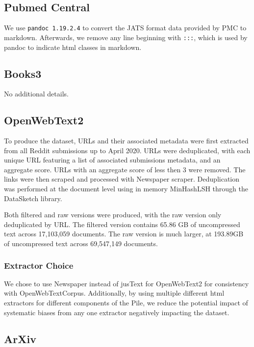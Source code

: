 \documentclass[11pt,a4paper]{article}
\begin{document}
\begin{appendices}
\subsection{Pubmed Central}

We use {\tt pandoc 1.19.2.4} \citep{pandoc} to convert the JATS format data provided by PMC to markdown. Afterwards, we remove any line beginning with {\tt :::}, which is used by pandoc to indicate html classes in markdown.

\subsection{Books3}

No additional details.

\subsection{OpenWebText2}

To produce the dataset, URLs and their associated metadata were first extracted from all Reddit submissions up to April 2020. URLs were deduplicated, with each unique URL featuring a list of associated submissions metadata, and an aggregate score. URLs with an aggregate score of less then 3 were removed. The links were then scraped and processed with Newspaper scraper. Deduplication was performed at the document level using in memory MinHashLSH through the DataSketch library.

Both filtered and raw versions were produced, with the raw version only deduplicated by URL. The filtered version contains 65.86 GB of uncompressed text across 17,103,059 documents. The raw version is much larger, at 193.89GB of uncompressed text across 69,547,149 documents.

\subsubsection{Extractor Choice}

We chose to use Newspaper instead of jusText for OpenWebText2 for consistency with OpenWebTextCorpus. Additionally, by using multiple different html extractors for different components of the Pile, we reduce the potential impact of systematic biases from any one extractor negatively impacting the dataset.

\subsection{ArXiv}


\end{appendices}
\end{document}
